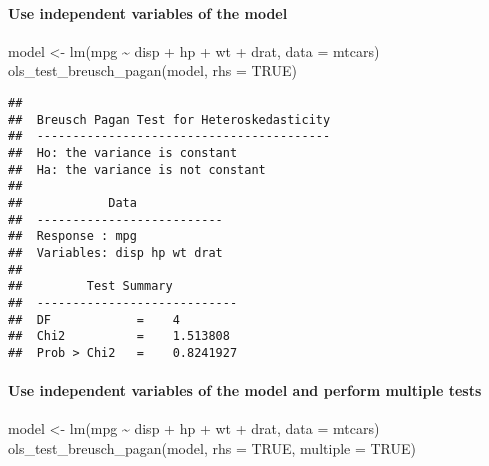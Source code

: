\documentclass[
]{article}
\newenvironment{Shaded}{\begin{snugshade}}{\end{snugshade}}
\newcommand{\AttributeTok}[1]{\textcolor[rgb]{0.77,0.63,0.00}{#1}}
\newcommand{\ConstantTok}[1]{\textcolor[rgb]{0.00,0.00,0.00}{#1}}
\newcommand{\FunctionTok}[1]{\textcolor[rgb]{0.00,0.00,0.00}{#1}}
\newcommand{\NormalTok}[1]{#1}
\newcommand{\OtherTok}[1]{\textcolor[rgb]{0.56,0.35,0.01}{#1}}
\newcommand{\SpecialCharTok}[1]{\textcolor[rgb]{0.00,0.00,0.00}{#1}}
\begin{document}
\hypertarget{use-independent-variables-of-the-model}{%
\paragraph{Use independent variables of the
model}\label{use-independent-variables-of-the-model}}

\begin{Shaded}
\begin{Highlighting}[]
\NormalTok{model }\OtherTok{\textless{}{-}} \FunctionTok{lm}\NormalTok{(mpg }\SpecialCharTok{\textasciitilde{}}\NormalTok{ disp }\SpecialCharTok{+}\NormalTok{ hp }\SpecialCharTok{+}\NormalTok{ wt }\SpecialCharTok{+}\NormalTok{ drat, }\AttributeTok{data =}\NormalTok{ mtcars)}
\FunctionTok{ols\_test\_breusch\_pagan}\NormalTok{(model, }\AttributeTok{rhs =} \ConstantTok{TRUE}\NormalTok{)}
\end{Highlighting}
\end{Shaded}

\begin{verbatim}
## 
##  Breusch Pagan Test for Heteroskedasticity
##  -----------------------------------------
##  Ho: the variance is constant            
##  Ha: the variance is not constant        
## 
##            Data            
##  --------------------------
##  Response : mpg 
##  Variables: disp hp wt drat 
## 
##         Test Summary         
##  ----------------------------
##  DF            =    4 
##  Chi2          =    1.513808 
##  Prob > Chi2   =    0.8241927
\end{verbatim}

\hypertarget{use-independent-variables-of-the-model-and-perform-multiple-tests}{%
\paragraph{Use independent variables of the model and perform multiple
tests}\label{use-independent-variables-of-the-model-and-perform-multiple-tests}}

\begin{Shaded}
\begin{Highlighting}[]
\NormalTok{model }\OtherTok{\textless{}{-}} \FunctionTok{lm}\NormalTok{(mpg }\SpecialCharTok{\textasciitilde{}}\NormalTok{ disp }\SpecialCharTok{+}\NormalTok{ hp }\SpecialCharTok{+}\NormalTok{ wt }\SpecialCharTok{+}\NormalTok{ drat, }\AttributeTok{data =}\NormalTok{ mtcars)}
\FunctionTok{ols\_test\_breusch\_pagan}\NormalTok{(model, }\AttributeTok{rhs =} \ConstantTok{TRUE}\NormalTok{, }\AttributeTok{multiple =} \ConstantTok{TRUE}\NormalTok{)}
\end{Highlighting}
\end{Shaded}
\end{document}
